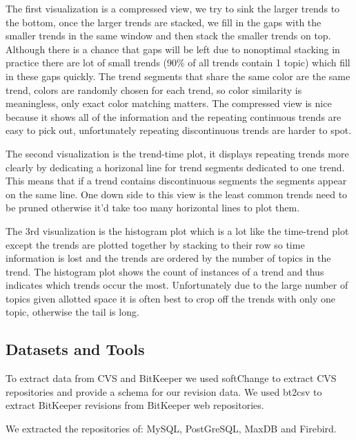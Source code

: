 \documentclass[times, 10pt,twocolumn]{article}
\begin{document}
The first visualization is a compressed view, we try to sink the
larger trends to the bottom, once the larger trends are stacked, we
fill in the gaps with the smaller trends in the same window and then
stack the smaller trends on top. Although there is a chance that gaps
will be left due to nonoptimal stacking in practice there are lot of
small trends (90\% of all trends contain 1 topic) which fill in these
gaps quickly. The trend segments that share the same color are the
same trend, colors are randomly chosen for each trend, so color
similarity is meaningless, only exact color matching matters.
The compressed view is nice because it shows all of the
information and the repeating continuous trends are easy to pick out,
unfortunately repeating discontinuous trends are harder to spot.

The second visualization is the trend-time plot, it displays repeating
trends more clearly by dedicating a horizonal line for trend segments
dedicated to one trend. This means that if a trend contains
discontinuous segments the segments appear on the same line. One down
side to this view is the least common trends need to be pruned
otherwise it'd take too many horizontal lines to plot them.

The 3rd visualization is the histogram plot which is a lot like the
time-trend plot except the trends are plotted together by stacking to
their row so time information is lost and the trends are ordered by
the number of topics in the trend. The histogram plot shows the count
of instances of a trend and thus indicates which trends occur the
most. Unfortunately due to the large number of topics given allotted
space it is often best to crop off the trends with only one topic,
otherwise the tail is long.



\subsection{Datasets and Tools}

To extract data from CVS and BitKeeper we used softChange to extract
CVS repositories and provide a schema for our revision data. We used
bt2csv to extract BitKeeper revisions from BitKeeper web repositories.

We extracted the repositories of: MySQL, PostGreSQL, MaxDB and
Firebird.

\end{document}
